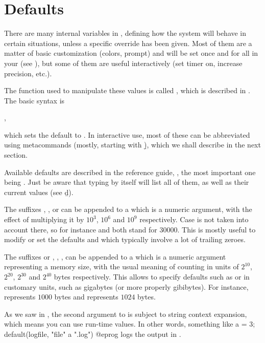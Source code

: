 \section{Defaults}
\label{se:defaults}

\noindent There are many internal variables in , defining how the
system will behave in certain situations, unless a specific override has been
given. Most of them are a matter of basic customization (colors, prompt) and
will be set once and for all in your  (see
), but some of them are useful interactively (set timer on,
increase precision, etc.).

The function used to manipulate these values is called , which
is described in . The basic syntax is

,

\noindent which sets the default  to . In interactive
use, most of these can be abbreviated using  metacommands
(mostly, starting with \b), which we shall describe in the next section.

Available defaults are described in the reference guide,
, the most important one being .
Just be aware that typing  by itself will list all of them, as
well as their current values (see \b{d}).

 The suffixes , ,  or  can be
appended to a  which is a numeric argument, with the effect of
multiplying it by $10^3$, $10^6$ and $10^9$ respectively. Case is not taken
into account there, so for instance  and  both stand for
$30000$. This is mostly useful to modify or set the defaults 
and  which typically involve a lot of trailing zeroes.

The suffixes  or , , ,  can be
appended to a  which is a numeric argument representing a memory
size, with the usual meaning of counting in units of $2^{10}$, $2^{20}$,
$2^{30}$ and $2^{40}$ bytes respectively. This allows to specify defaults
such as  or  in customary units, such as
gigabytes (or more properly gibibytes). For instance,  represents
$1000$ bytes and  represents $1024$ bytes.

 As we saw in ,
the second argument to  is subject to string context
expansion, which means you can use run-time values. In other words, something
like
\bprog
  a = 3;
  default(logfile, "file" a ".log")
@eprog
logs the output in .

